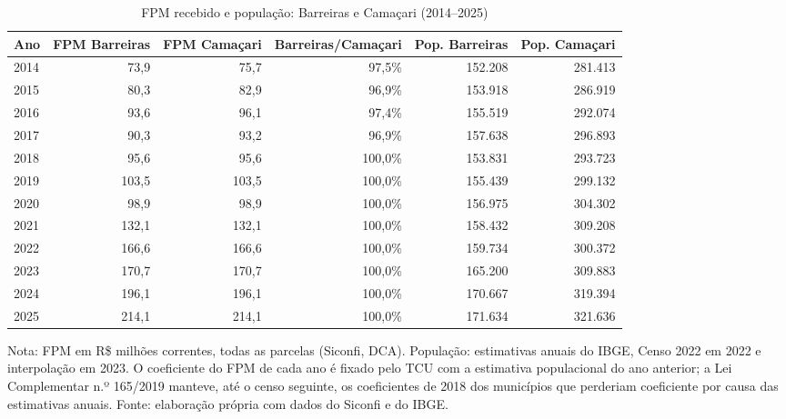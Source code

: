 \begin{table}[H]
\centering\footnotesize
\setlength{\tabcolsep}{4pt}
\caption{FPM recebido e população: Barreiras e Camaçari (2014--2025)}
\label{tab:fpm}
\begin{adjustbox}{max width=\textwidth}
\begin{tabular}{lrrrrr}
\toprule
Ano & FPM Barreiras & FPM Camaçari & Barreiras/Camaçari & Pop. Barreiras & Pop. Camaçari \\
\midrule
2014 & 73,9 & 75,7 & 97,5\% & 152.208 & 281.413 \\
2015 & 80,3 & 82,9 & 96,9\% & 153.918 & 286.919 \\
2016 & 93,6 & 96,1 & 97,4\% & 155.519 & 292.074 \\
2017 & 90,3 & 93,2 & 96,9\% & 157.638 & 296.893 \\
2018 & 95,6 & 95,6 & 100,0\% & 153.831 & 293.723 \\
2019 & 103,5 & 103,5 & 100,0\% & 155.439 & 299.132 \\
2020 & 98,9 & 98,9 & 100,0\% & 156.975 & 304.302 \\
2021 & 132,1 & 132,1 & 100,0\% & 158.432 & 309.208 \\
2022 & 166,6 & 166,6 & 100,0\% & 159.734 & 300.372 \\
2023 & 170,7 & 170,7 & 100,0\% & 165.200 & 309.883 \\
2024 & 196,1 & 196,1 & 100,0\% & 170.667 & 319.394 \\
2025 & 214,1 & 214,1 & 100,0\% & 171.634 & 321.636 \\
\bottomrule
\end{tabular}
\end{adjustbox}
\par\vspace{3pt}\parbox{\textwidth}{\scriptsize Nota: FPM em R\$ milhões correntes, todas as parcelas (Siconfi, DCA). População: estimativas anuais do IBGE, Censo 2022 em 2022 e interpolação em 2023. O coeficiente do FPM de cada ano é fixado pelo TCU com a estimativa populacional do ano anterior; a Lei Complementar n.º 165/2019 manteve, até o censo seguinte, os coeficientes de 2018 dos municípios que perderiam coeficiente por causa das estimativas anuais. Fonte: elaboração própria com dados do Siconfi e do IBGE.}
\end{table}
